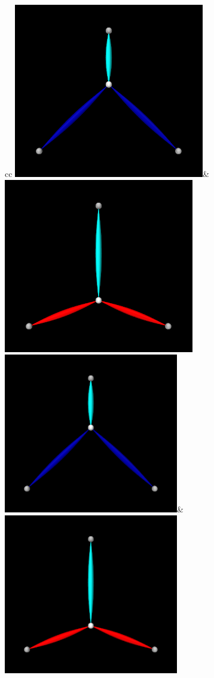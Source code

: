 \begin{figure}[ht]
\begin{center}
\begin{tabular}{cc}
   \iflatexml
      \includegraphics[]{images/InverseSpringForceA}&
      \includegraphics[]{images/InverseSpringForceB}
   \else
      \includegraphics[width=3in]{images/InverseSpringForceA}&
      \includegraphics[width=3in]{images/InverseSpringForceB}

\end{tabular}
\end{center}
\end{figure}
